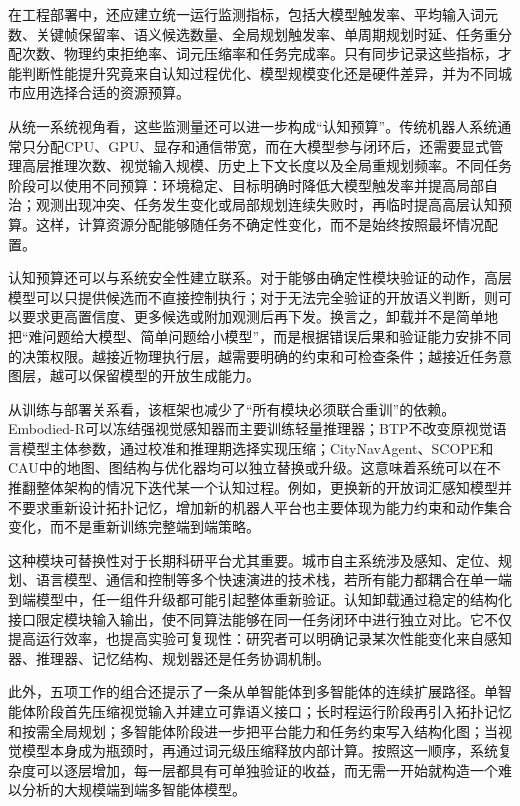 在工程部署中，还应建立统一运行监测指标，包括大模型触发率、平均输入词元数、关键帧保留率、语义候选数量、全局规划触发率、单周期规划时延、任务重分配次数、物理约束拒绝率、词元压缩率和任务完成率。只有同步记录这些指标，才能判断性能提升究竟来自认知过程优化、模型规模变化还是硬件差异，并为不同城市应用选择合适的资源预算。


从统一系统视角看，这些监测量还可以进一步构成“认知预算”。传统机器人系统通常只分配CPU、GPU、显存和通信带宽，而在大模型参与闭环后，还需要显式管理高层推理次数、视觉输入规模、历史上下文长度以及全局重规划频率。不同任务阶段可以使用不同预算：环境稳定、目标明确时降低大模型触发率并提高局部自治；观测出现冲突、任务发生变化或局部规划连续失败时，再临时提高高层认知预算。这样，计算资源分配能够随任务不确定性变化，而不是始终按照最坏情况配置。

认知预算还可以与系统安全性建立联系。对于能够由确定性模块验证的动作，高层模型可以只提供候选而不直接控制执行；对于无法完全验证的开放语义判断，则可以要求更高置信度、更多候选或附加观测后再下发。换言之，卸载并不是简单地把“难问题给大模型、简单问题给小模型”，而是根据错误后果和验证能力安排不同的决策权限。越接近物理执行层，越需要明确的约束和可检查条件；越接近任务意图层，越可以保留模型的开放生成能力。

从训练与部署关系看，该框架也减少了“所有模块必须联合重训”的依赖。Embodied-R可以冻结强视觉感知器而主要训练轻量推理器；BTP不改变原视觉语言模型主体参数，通过校准和推理期选择实现压缩；CityNavAgent、SCOPE和CAU中的地图、图结构与优化器均可以独立替换或升级。这意味着系统可以在不推翻整体架构的情况下迭代某一个认知过程。例如，更换新的开放词汇感知模型并不要求重新设计拓扑记忆，增加新的机器人平台也主要体现为能力约束和动作集合变化，而不是重新训练完整端到端策略。

这种模块可替换性对于长期科研平台尤其重要。城市自主系统涉及感知、定位、规划、语言模型、通信和控制等多个快速演进的技术栈，若所有能力都耦合在单一端到端模型中，任一组件升级都可能引起整体重新验证。认知卸载通过稳定的结构化接口限定模块输入输出，使不同算法能够在同一任务闭环中进行独立对比。它不仅提高运行效率，也提高实验可复现性：研究者可以明确记录某次性能变化来自感知器、推理器、记忆结构、规划器还是任务协调机制。

此外，五项工作的组合还提示了一条从单智能体到多智能体的连续扩展路径。单智能体阶段首先压缩视觉输入并建立可靠语义接口；长时程运行阶段再引入拓扑记忆和按需全局规划；多智能体阶段进一步把平台能力和任务约束写入结构化图；当视觉模型本身成为瓶颈时，再通过词元级压缩释放内部计算。按照这一顺序，系统复杂度可以逐层增加，每一层都具有可单独验证的收益，而无需一开始就构造一个难以分析的大规模端到端多智能体模型。

